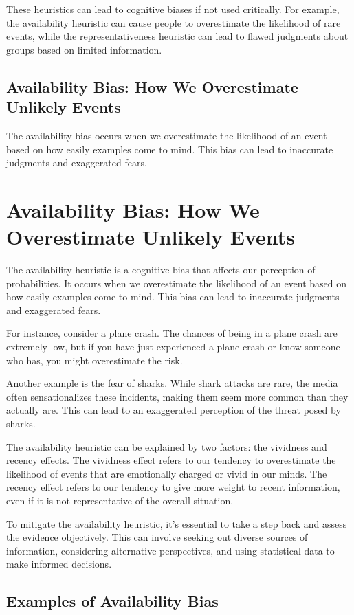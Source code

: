 \documentclass{report}%
\begin{document}
{{{{{{{{{{{These heuristics can lead to cognitive biases if not used critically. For example, the availability heuristic can cause people to overestimate the likelihood of rare events, while the representativeness heuristic can lead to flawed judgments about groups based on limited information.%
\section{Availability Bias: How We Overestimate Unlikely Events}%
The availability bias occurs when we overestimate the likelihood of an event based on how easily examples come to mind. This bias can lead to inaccurate judgments and exaggerated fears.

%
\chapter{Availability Bias: How We Overestimate Unlikely Events}

The availability heuristic is a cognitive bias that affects our perception of probabilities. It occurs when we overestimate the likelihood of an event based on how easily examples come to mind. This bias can lead to inaccurate judgments and exaggerated fears.

For instance, consider a plane crash. The chances of being in a plane crash are extremely low, but if you have just experienced a plane crash or know someone who has, you might overestimate the risk.

Another example is the fear of sharks. While shark attacks are rare, the media often sensationalizes these incidents, making them seem more common than they actually are. This can lead to an exaggerated perception of the threat posed by sharks.

The availability heuristic can be explained by two factors: the vividness and recency effects. The vividness effect refers to our tendency to overestimate the likelihood of events that are emotionally charged or vivid in our minds. The recency effect refers to our tendency to give more weight to recent information, even if it is not representative of the overall situation.

To mitigate the availability heuristic, it's essential to take a step back and assess the evidence objectively. This can involve seeking out diverse sources of information, considering alternative perspectives, and using statistical data to make informed decisions.

\section{Examples of Availability Bias}

}}}}}}}}}}}
\end{document}
